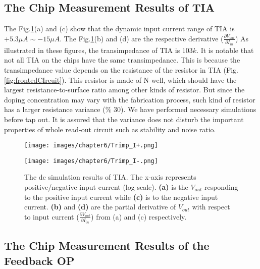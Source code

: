 \subsection{The Chip Measurement Results of TIA}
The Fig.\ref{fig:chip:TIA}(a) and (c) show that the dynamic input current range of TIA is $+5.3\mu A \sim -15\mu A$.
The Fig.\ref{fig:chip:TIA}(b) and (d) are the respective derivative ($\frac{\partial V_{out}}{\partial I_{in}}$)
As illustrated in these figures, the transimpedance of TIA is $103k$.
It is notable that not all TIA on the chips have the same transimpedance.
This is because the transimpedance value depends on the resistance of the resistor in TIA (Fig.\ref{fig:frontedCIrcuit}).
This resistor is made of N-well, which should have the largest resistance-to-surface ratio among other kinds of resistor.
But since the doping concentration may vary with the fabrication process, such kind of resistor has a larger resistance variance (\% 30).
We have performed necessary simulations before tap out.
It is assured that the variance does not disturb the important properties of whole read-out circuit such as stability and noise ratio.

\begin{figure}[tbh!]
    \centering
    \begin{minipage}[t]{0.65\textwidth}
        \texttt{[image: images/chapter6/Trimp\_I+.png]}
        \raggedleft
    \end{minipage}
    \hfill
    \centering
    \begin{minipage}[t]{0.65\textwidth}
        \texttt{[image: images/chapter6/Trimp\_I-.png]}
        \raggedleft
    \end{minipage}
    \caption{The dc simulation results of TIA. The x-axis represents positive/negative input current (log scale). \textbf{(a)} is the $V_{out}$ responding to the positive input current while \textbf{(c)} is to the negative input current.
                    \textbf{(b)} and \textbf{(d)} are the partial derivative of $V_{out}$ with respect to input current ($\frac{\partial V_{out}}{\partial {I_{in}}}$) from (a) and (c) respectively.}
    \label{fig:chip:TIA}
\end{figure}

\subsection{The Chip Measurement Results of the Feedback OP} \label{sec:ch6:OP}

